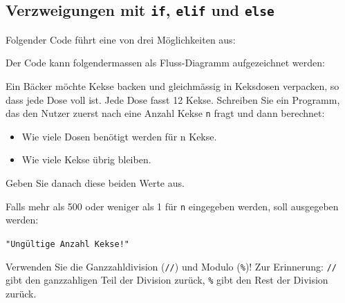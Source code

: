 \subsection{Verzweigungen mit \texorpdfstring{\lstinline|if|}{if}, \texorpdfstring{\lstinline|elif|}{elif} und \texorpdfstring{\lstinline|else|}{else}}
\begin{myexample}
Folgender Code führt eine von drei Möglichkeiten aus:


Der Code kann folgendermassen als Fluss-Diagramm aufgezeichnet werden:

\begin{figure}[H]
	\centering
	
\end{figure}
\end{myexample}

\begin{myexercise}
	Ein Bäcker möchte Kekse backen und gleichmässig in Keksdosen verpacken, so dass jede Dose voll ist. Jede Dose fasst 12 Kekse. Schreiben Sie ein Programm, das den Nutzer zuerst nach eine Anzahl Kekse \lstinline|n| fragt und dann berechnet:

	\begin{itemize}
		\item Wie viele Dosen benötigt werden für n Kekse.
		\item Wie viele Kekse übrig bleiben.
	\end{itemize}

	Geben Sie danach diese beiden Werte aus.

	Falls mehr als 500 oder weniger als 1 für \texttt{n} eingegeben werden, soll ausgegeben werden:

	\lstinline|"Ungültige Anzahl Kekse!"|

	Verwenden Sie die Ganzzahldivision (\lstinline|//|) und Modulo (\lstinline|%|)! Zur Erinnerung: \lstinline|//| gibt den ganzzahligen Teil der Division zurück, \lstinline|%| gibt den Rest der Division zurück.

	\begin{myanswer}
		
	\end{myanswer}
\end{myexercise}

